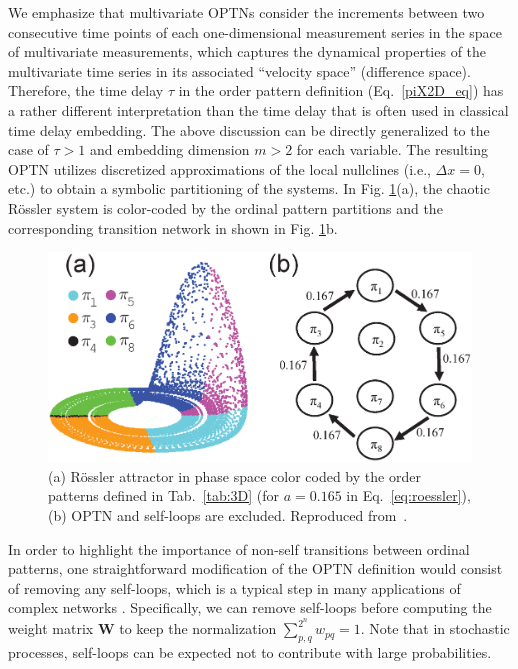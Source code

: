 		We emphasize that multivariate OPTNs consider the increments between two consecutive time points of each one-dimensional measurement series in the space of multivariate measurements, which captures the dynamical properties of the multivariate time series in its associated ``velocity space'' (difference space). Therefore, the time delay $\tau$ in the order pattern definition (Eq.~\eqref{piX2D_eq}) has a rather different interpretation than the time delay that is often used in classical time delay embedding. The above discussion can be directly generalized to the case of $\tau>1$ and embedding dimension $m>2$ for each variable. The resulting OPTN utilizes discretized approximations of the local nullclines (i.e., $\Delta x=0$, etc.) to obtain a symbolic partitioning of the systems. In Fig. \ref{fig:rosslerTwoA}(a), the chaotic R\"ossler system is color-coded by the ordinal pattern partitions and the corresponding transition network in shown in Fig. \ref{fig:rosslerTwoA}b. 
\begin{figure}[ht]
	\centering
	\includegraphics[width=0.7\columnwidth]{Chapter05_TransitionNt/rossler_0165N.eps}
\caption{(a) R\"ossler attractor in phase space color coded by the order patterns defined in Tab.~\ref{tab:3D} (for $a = 0.165$ in Eq.~\eqref{eq:roessler}), (b) OPTN and self-loops are excluded. Reproduced from~\cite{Zhang2017b}. \label{fig:rosslerTwoA}}
\end{figure}

In order to highlight the importance of non-self transitions between ordinal patterns, one straightforward modification of the OPTN definition would consist of removing any self-loops, which is a typical step in many applications of complex networks \cite{Costa2007}. Specifically, we can remove self-loops before computing the weight matrix $\mathbf{W}$ to keep the normalization $\sum_{p,q}^{2^n} w_{pq} = 1$. Note that in stochastic processes, self-loops can be expected not to contribute with large probabilities. 
		
